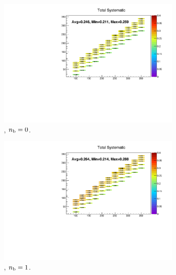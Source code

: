 \begin{figure}[h!]
  \centering
  \begin{subfigure}[b]{0.47\textwidth}
    \includegraphics[width=\textwidth]{Figs/sms/t2cc/v37/systs/total_T2cc_eq0b_le3j_incl.pdf}
    \caption{\njlow, $n_{\text{b}} = 0$.}
  \end{subfigure}
  \begin{subfigure}[b]{0.47\textwidth}
    \includegraphics[width=\textwidth]{Figs/sms/t2cc/v37/systs/total_T2cc_eq1b_le3j_incl.pdf}
    \caption{\njlow, $n_{\text{b}} = 1$.}
  \end{subfigure}\\
  \begin{subfigure}[b]{0.47\textwidth}

\end{subfigure}
\end{figure}
